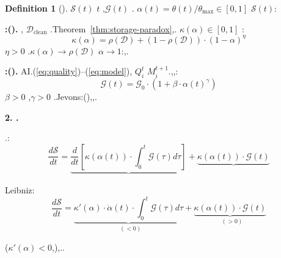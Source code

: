 \documentclass[12pt,a4paper]{article}
\theoremstyle{definition}
\newtheorem{definition}{Definition}[section]
\theoremstyle{remark}
\begin{document}
\begin{definition}[]
 $\mathcal{S}(t)$  $t$ ,$\mathcal{G}(t)$ . $\alpha(t) = \theta(t) / \theta_{\max} \in [0, 1]$  $\mathcal{S}(t)$:

\textbf{:().} , $\mathcal{D}_{\text{clean}}$ .Theorem~\ref{thm:storage-paradox},. $\kappa(\alpha) \in [0, 1]$ :
\begin{equation}
\kappa(\alpha) = \rho(\mathcal{D}) + (1 - \rho(\mathcal{D})) \cdot (1 - \alpha)^{\eta}
\end{equation}
 $\eta > 0$ .$\kappa(\alpha) \to \rho(\mathcal{D})$  $\alpha \to 1$:,.

\textbf{:().} AI.(\ref{eq:quality})–(\ref{eq:model}), $Q_i^t$  $M_i^{t+1}$.,,:
\begin{equation}
\mathcal{G}(t) = \mathcal{G}_0 \cdot \left(1 + \beta \cdot \alpha(t)^{\gamma}\right)
\end{equation}
 $\beta > 0$ ,$\gamma > 0$ .Jevons:(),,.
\end{definition}

\medskip
\noindent\textbf{2. .}

.:
\begin{equation}
\frac{d\mathcal{S}}{dt} = \underbrace{\frac{d}{dt}\left[\kappa(\alpha(t)) \cdot \int_0^t \mathcal{G}(\tau) d\tau\right]}_{\text{}} + \underbrace{\kappa(\alpha(t)) \cdot \mathcal{G}(t)}_{\text{}}
\end{equation}

Leibniz:
\begin{equation}
\frac{d\mathcal{S}}{dt} = \underbrace{\kappa'(\alpha) \cdot \dot{\alpha}(t) \cdot \int_0^t \mathcal{G}(\tau) d\tau}_{\text{ }(<0)} + \underbrace{\kappa(\alpha(t)) \cdot \mathcal{G}(t)}_{\text{ }(>0)}
\end{equation}

($\kappa'(\alpha) < 0$,),..
\end{document}
